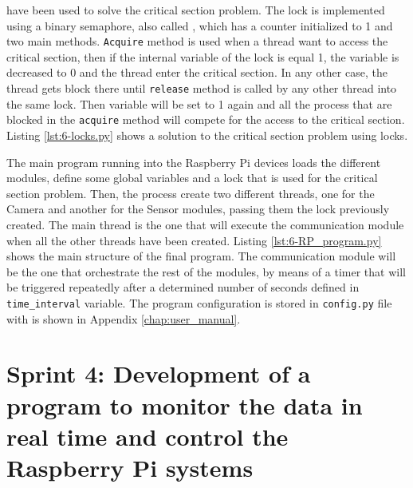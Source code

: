  have been used to solve the critical section problem. The lock is implemented using a binary semaphore, also called , which has a counter initialized to 1 and two main methods. \texttt{Acquire} method is used when a thread want to access the critical section, then if the internal variable of the lock is equal 1, the variable is decreased to 0 and the thread enter the critical section. In any other case, the thread gets block there until \texttt{release} method is called by any other thread into the same lock. Then variable will be set to 1 again and all the process that are blocked in the \texttt{acquire} method will compete for the access to the critical section. Listing \ref{lst:6-locks.py} shows a solution to the critical section problem using locks.



The main program running into the Raspberry Pi devices loads the different modules, define some global variables and a lock that is used for the critical section problem. Then, the process create two different threads, one for the Camera and another for the Sensor modules, passing them the lock previously created. The main thread is the one that will execute the communication module when all the other threads have been created. Listing \ref{lst:6-RP_program.py} shows the main structure of the final program. The communication module will be the one that orchestrate the rest of the modules, by means of a timer that will be triggered repeatedly after a determined number of seconds defined in \texttt{time\_interval} variable. The program configuration is stored in \texttt{config.py} file with is shown in Appendix \ref{chap:user_manual}.





\section{Sprint 4: Development of a program to monitor the data in real time and control the Raspberry Pi systems}


